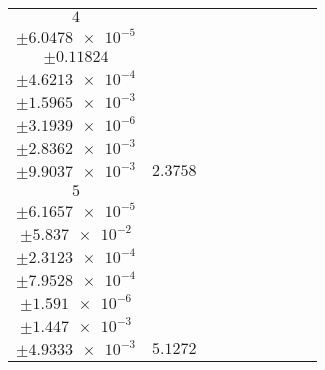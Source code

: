 \documentclass[8pt]{article}
\begin{document}
\begin{longtable}[l]{c c c c c c c c c}
$\num{4}$ & \begin{tabular}[c]{@{}c@{}}$\num{2.9818e-2}$ \\ $\pm\num{6.0478e-5}$\end{tabular} & \begin{tabular}[c]{@{}c@{}}$\num{0.49109}$ \\ $\pm\num{0.11824}$\end{tabular} & \begin{tabular}[c]{@{}c@{}}$\num{1.9093}$ \\ $\pm\num{4.6213e-4}$\end{tabular} & \begin{tabular}[c]{@{}c@{}}$\num{639.59}$ \\ $\pm\num{1.5965e-3}$\end{tabular} & \begin{tabular}[c]{@{}c@{}}$\num{1.2795}$ \\ $\pm\num{3.1939e-6}$\end{tabular} & \begin{tabular}[c]{@{}c@{}}$\num{1.1499}$ \\ $\pm\num{2.8362e-3}$\end{tabular} & \begin{tabular}[c]{@{}c@{}}$\num{4.2065}$ \\ $\pm\num{9.9037e-3}$\end{tabular} & $\num{2.3758}$\\
$\num{5}$ & \begin{tabular}[c]{@{}c@{}}$\num{6.0945e-2}$ \\ $\pm\num{6.1657e-5}$\end{tabular} & \begin{tabular}[c]{@{}c@{}}$\num{0.7304}$ \\ $\pm\num{5.837e-2}$\end{tabular} & \begin{tabular}[c]{@{}c@{}}$\num{5.2049}$ \\ $\pm\num{2.3123e-4}$\end{tabular} & \begin{tabular}[c]{@{}c@{}}$\num{642.88}$ \\ $\pm\num{7.9528e-4}$\end{tabular} & \begin{tabular}[c]{@{}c@{}}$\num{1.2861}$ \\ $\pm\num{1.591e-6}$\end{tabular} & \begin{tabular}[c]{@{}c@{}}$\num{1.1765}$ \\ $\pm\num{1.447e-3}$\end{tabular} & \begin{tabular}[c]{@{}c@{}}$\num{4.2246}$ \\ $\pm\num{4.9333e-3}$\end{tabular} & $\num{5.1272}$\\

\end{longtable}
\end{document}
